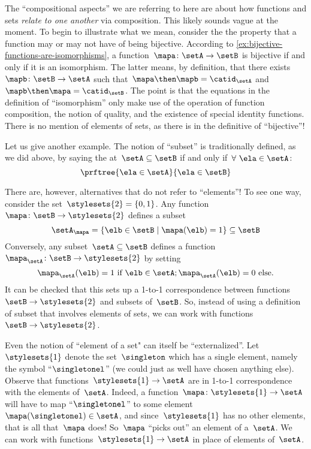 The ``compositional aspects'' we are referring to here are about how functions and sets \emph{relate to one another} via composition.
This likely sounds vague at the moment.
To begin to illustrate what we mean, consider the the property that a function may or may not have of being bijective.
According to \cref{ex:bijective-functions-are-isomorphisms}, a function~$\mapa\colon \setA \to \setB$ is bijective if and only if it is an isomorphism.
The latter means, by definition, that there exists~$\mapb \colon \setB \to \setA$ such that~$\mapa \then \mapb = \catid_\setA$ and~$\mapb \then \mapa = \catid_\setB$.
The point is that the equations in the definition of ``isomorphism'' only make use of the operation of function composition, the notion of quality, and the existence of special identity functions.
There is no mention of elements of sets, as there is in the definitive of ``bijective''!

Let us give another example.
The notion of ``subset'' is traditionally defined, as we did above, by saying the at~$\setA \subseteq \setB$ if and only if~$\forall \ \ela \in \setA$:
\begin{equation*}
    \prftree{\ela \in \setA }{\ela \in \setB}
\end{equation*}

There are, however, alternatives that do not refer to ``elements''!
To see one way, consider the set~$\stylesets{2} = \{ 0, 1\}$.
Any function~$\mapa \colon \setB \to \stylesets{2}$ defines a subset
\begin{equation*}
    \setA_\mapa = \{ \elb \in \setB \mid \mapa(\elb) = 1 \} \subseteq \setB
\end{equation*}
Conversely, any subset~$\setA \subseteq \setB$ defines a function~$\mapa_\setA \colon \setB \to \stylesets{2}$ by setting
\begin{equation*}
    \mapa_\setA(\elb) = 1 \text{ if } \elb \in \setA; \mapa_\setA(\elb) = 0 \text{ else}.
\end{equation*}
It can be checked that this sets up a 1-to-1 correspondence between functions~$\setB \to \stylesets{2}$ and subsets of~$\setB$.
So, instead of using a definition of subset that involves elements of sets, we can work with functions~$\setB \to \stylesets{2}$.

Even the notion of ``element of a set" can itself be ``externalized''.
Let~$\stylesets{1}$ denote the set~$\singleton$ which has a single element, namely the symbol ``$\singletonel$'' (we could just as well have chosen anything else).
Observe that functions~$\stylesets{1} \to \setA$ are in 1-to-1 correspondence with the elements of~$\setA$.
Indeed, a function~$\mapa\colon \stylesets{1} \to \setA$ will have to map ``$\singletonel$'' to some element~$\mapa(\singletonel) \in \setA$, and since~$\stylesets{1}$ has no other elements, that is all that~$\mapa$ does!
So~$\mapa$ ``picks out'' an element of a~$\setA$.
We can work with functions~$\stylesets{1} \to \setA$ in place of elements of~$\setA$.

